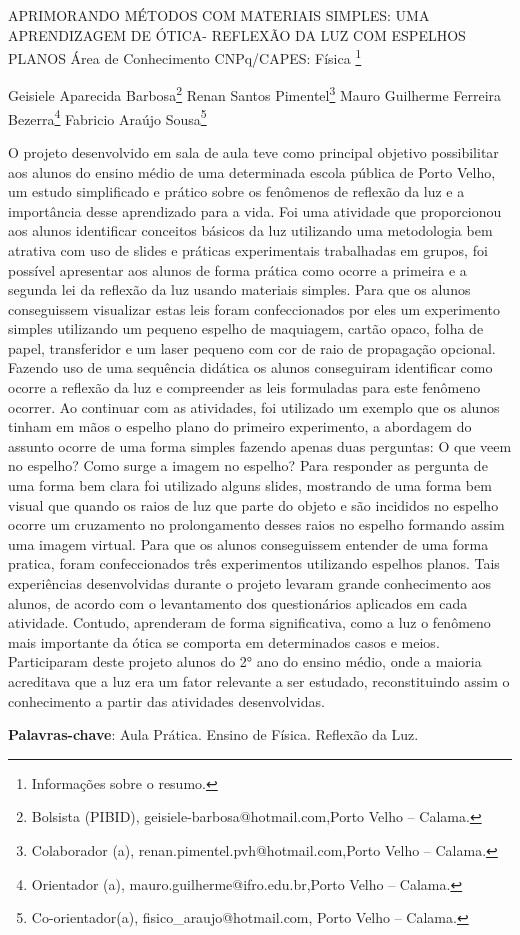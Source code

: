 \documentclass[article,12pt,onesidea,4paper,english,brazil]{abntex2}
\begin{document}
	
	
	\frenchspacing 
	
	\begin{center}
		\LARGE APRIMORANDO MÉTODOS COM MATERIAIS SIMPLES: UMA APRENDIZAGEM DE ÓTICA- REFLEXÃO DA LUZ COM ESPELHOS PLANOS
		Área de Conhecimento CNPq/CAPES: Física
		\footnote{Informações sobre o resumo.}
		
		\normalsize
		Geisiele Aparecida Barbosa\footnote{Bolsista (PIBID), geisiele-barbosa@hotmail.com,Porto Velho – Calama.} 
		Renan Santos Pimentel\footnote{Colaborador (a), renan.pimentel.pvh@hotmail.com,Porto Velho – Calama.} 
		Mauro Guilherme Ferreira Bezerra\footnote{Orientador (a), mauro.guilherme@ifro.edu.br,Porto Velho – Calama.} 
		Fabricio Araújo Sousa\footnote{Co-orientador(a), fisico\_araujo@hotmail.com, Porto Velho – Calama.} 
	\end{center}
	
	\noindent 
	O projeto desenvolvido em sala de aula teve como principal objetivo possibilitar aos alunos do ensino médio de uma determinada escola pública de Porto Velho, um estudo simplificado e prático sobre os fenômenos de reflexão da luz e a importância desse aprendizado para a vida. Foi uma atividade que proporcionou aos alunos identificar conceitos básicos da luz utilizando uma metodologia bem atrativa com uso de slides e práticas experimentais trabalhadas em grupos, foi possível apresentar aos alunos de forma prática como ocorre a primeira e a segunda lei da reflexão da luz usando materiais simples. Para que os alunos conseguissem visualizar estas leis foram confeccionados por eles um experimento simples utilizando um pequeno espelho de maquiagem, cartão opaco, folha de papel, transferidor e um laser pequeno com cor de raio de propagação opcional. Fazendo uso de uma sequência didática os alunos conseguiram identificar como ocorre a reflexão da luz e compreender as leis formuladas para este fenômeno ocorrer. Ao continuar com as atividades, foi utilizado um exemplo que os alunos tinham em mãos o espelho plano do primeiro experimento, a abordagem do assunto ocorre de uma forma simples fazendo apenas duas perguntas: O que veem no espelho? Como surge a imagem no espelho? Para responder as pergunta de uma forma bem clara foi utilizado alguns slides, mostrando de uma forma bem visual que quando os raios de luz que parte do objeto e são incididos no espelho ocorre um cruzamento no prolongamento desses raios no espelho formando assim uma imagem virtual. Para que os alunos conseguissem entender de uma forma pratica, foram confeccionados três experimentos utilizando espelhos planos. Tais experiências desenvolvidas durante o projeto levaram grande conhecimento aos alunos, de acordo com o levantamento dos questionários aplicados em cada atividade. Contudo, aprenderam de forma significativa, como a luz o fenômeno mais importante da ótica se comporta em determinados casos e meios. Participaram deste projeto alunos do 2° ano do ensino médio, onde a maioria acreditava que a luz era um fator relevante a ser estudado, reconstituindo assim o conhecimento a partir das atividades desenvolvidas.
	
	\vspace{\onelineskip}
	
	\noindent
	\textbf{Palavras-chave}: Aula Prática. Ensino de Física. Reflexão da Luz. 
	
\end{document}
